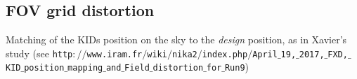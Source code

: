 \subsection{FOV grid distortion}

Matching of the KIDs position on the sky to the \emph{design} position, as in
Xavier's study (see
{\tt http$://$www.iram.fr$/$wiki$/$nika2$/$index.php$/$April$\_$19,$\_$2017,$\_$FXD,$\_$KID$\_$position$\_$mapping$\_$and$\_$Field$\_$distortion$\_$for$\_$Run9})
